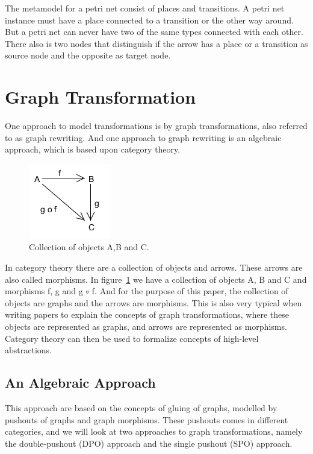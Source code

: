 \documentclass[pdftex,11pt,a4paper]{article}
\begin{document}
The metamodel for a petri net consist of places and transitions. A petri net
instance must have a place connected to a transition or the other way around.
But a petri net can never have two of the same types connected with each other.
There also is two nodes that distinguish if the arrow has a place or a
transition as source node and the opposite as target node.

\section{Graph Transformation}
\noindent One approach to model transformations is by graph transformations,
also referred to as graph rewriting. And one approach to graph rewriting is an algebraic
approach, which is based upon category theory\cite{Barr1990}.

\begin{figure}[H]
	\centering
	\includegraphics[scale=0.7]{figures/categoryTheory.png}
	\caption{Collection of objects A,B and C.}
	\label{fig:categoryTheory}
\end{figure}

In category theory there are a collection of objects and arrows. These arrows
are also called morphisms. In figure~\ref{fig:categoryTheory} we have a
collection of objects A, B and C and morphisms f, g and g $\circ$ f. And for the
purpose of this paper, the collection of objects are graphs and the arrows are
morphisms. This is also very typical when writing papers to explain the concepts
of graph transformations, where these objects are represented as graphs, and
arrows are represented as morphisms. Category theory can then be used to
formalize concepts of high-level abstractions.

\subsection{An Algebraic Approach}
\noindent This approach are based on the concepts of gluing of graphs, modelled
by pushouts of graphs and graph morphisms. These pushouts comes in different
categories, and we will look at two approaches to graph transformations, namely
the double-pushout (DPO) approach and the single pushout (SPO)
approach\cite{Loewe1997,Ehrig1997}.
\end{document}
